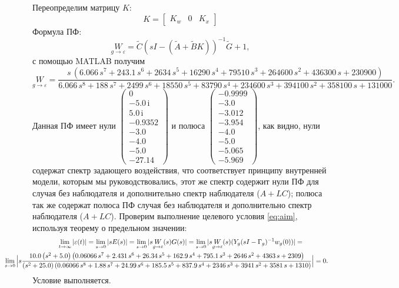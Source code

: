 Переопределим матрицу $K$:
\begin{equation*}
    K=\begin{bmatrix}
        K_w&0&K_x
    \end{bmatrix}
\end{equation*}
Формула ПФ:
\begin{equation*}
    \underset{g\rightarrow\varepsilon}{W}=\tilde C(sI-(\tilde A+\tilde BK))^{-1}\tilde G+1,
\end{equation*}
с помощью MATLAB получим
\begin{equation*}
    \underset{g\rightarrow\varepsilon}{W}=\frac{s\,{\left(6.066\,s^7 + 243.1\,s^6 + 2634\,s^5 + 16290\,s^4 + 79510\,s^3 + 264600\,s^2 + 436300\,s + 230900\right)}}{6.066\,s^8 + 188\,s^7 + 2499\,s^6 + 18550\,s^5 + 83790\,s^4 + 234600\,s^3 + 394100\,s^2 + 358100\,s + 131000}.
\end{equation*}
Данная ПФ имеет нули $\left(\begin{array}{c}
0\\
-5.0\,\mathrm{i}\\
5.0\,\mathrm{i}\\
-0.9352\\
-3.0\\
-4.0\\
-5.0\\
-27.14
\end{array}\right)$ и полюса $\left(\begin{array}{c}
-0.9999\\
-3.0\\
-3.012\\
-3.954\\
-4.0\\
-5.0\\
-5.065\\
-5.969
\end{array}\right)$, как видно, нули содержат спектр задающего воздействия, что 
соответствует принципу внутренней модели, которым мы руководствовались, этот же спектр 
содержит нули ПФ для случая без наблюдателя и 
дополнительно спектр наблюдателя ($A+LC$); полюса так же содержат полюса ПФ случая без
наблюдателя и дополнительно спектр наблюдателя ($A+LC$).
Проверим выполнение целевого условия \eqref{eq:aim}, используя теорему о предельном
значении:
\begin{multline*}
    \lim_{t\rightarrow\infty}|\varepsilon(t)|=\lim_{s\rightarrow0}|sE(s)|=
        \lim_{s\rightarrow0}|s\underset{g\rightarrow\varepsilon}{W}(s)G(s)|=
        \lim_{s\rightarrow0}|s\underset{g\rightarrow\varepsilon}{W}(s)(Y_g(sI-\Gamma_g)^{-1}w_{g}(0))|=\\
            \hspace*{-1.5cm}\lim_{s\rightarrow0}\Big|s\frac{10.0\,{\left(s^2 +5.0\right)}\,{\left(0.06066\,s^7 +2.431\,s^6 +26.34\,s^5 +162.9\,s^4 +795.1\,s^3 +2646\,s^2 +4363\,s+2309\right)}}{{\left(s^2 +25.0\right)}\,{\left(0.06066\,s^8 +1.88\,s^7 +24.99\,s^6 +185.5\,s^5 +837.9\,s^4 +2346\,s^3 +3941\,s^2 +3581\,s+1310\right)}}\Big|=0.
        \end{multline*}
Условие выполняется.

